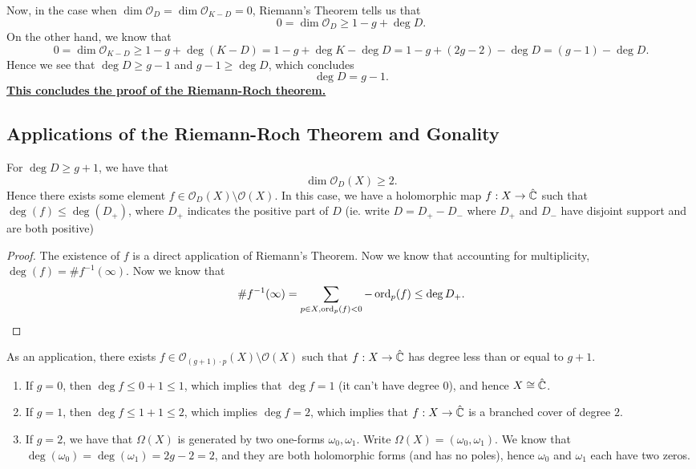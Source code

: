 \documentclass{article}
\begin{document}
{Now, in the case when $\dim \mathcal{O}_D = \dim \mathcal{O}_{K-D} = 0$, Riemann's Theorem tells us that
\[0 = \dim \mathcal{O}_D \geq 1 - g + \deg D.\]
On the other hand, we know that
\[0 = \dim \mathcal{O}_{K-D} \geq 1 - g + \deg(K-D) = 1 - g + \deg K - \deg D = 1 - g + (2g-2) - \deg D = (g - 1) - \deg D.\]
Hence we see that $\deg D \geq g-1$ and $g-1 \geq \deg D$, which concludes
\[\deg D = g-1.\]
\underline{\textbf{This concludes the proof of the Riemann-Roch theorem.}}

\subsection{Applications of the Riemann-Roch Theorem and Gonality}

\begin{theorem}
    For $\deg D \geq g + 1$, we have that
    \[\dim \mathcal{O}_D(X) \geq 2.\]
    Hence there exists some element $f \in \mathcal{O}_D(X) \setminus \mathcal{O}(X)$. In this case, we have a holomorphic map $f: X \to \hat{\mathbb{C}}$ such that $\deg(f) \leq \deg(D_+)$, where $D_+$ indicates the positive part of $D$ (ie. write $D = D_+ - D_-$ where $D_+$ and $D_-$ have disjoint support and are both positive)
\end{theorem}

\begin{proof}
    The existence of $f$ is a direct application of Riemann's Theorem. Now we know that accounting for multiplicity, $\deg(f) = \# f^{-1}(\infty)$. Now we know that
    \[\# f^{-1}(\infty) = \sum_{p \in X, \operatorname{ord}_p(f) < 0} -\operatorname{ord}_p(f) \leq \deg D_+.\]
\end{proof}

\begin{corollary}
        As an application, there exists $f \in \mathcal{O}_{(g+1) \cdot p}(X) \setminus \mathcal{O}(X)$ such that $f: X \to \hat{\mathbb{C}}$ has degree less than or equal to $g + 1$.
\end{corollary}

\begin{enumerate}
    \item If $g = 0$, then $\deg f \leq 0 + 1 \leq 1$, which implies that $\deg f = 1$ (it can't have degree $0$), and hence $X \cong \hat{\mathbb{C}}$.
    \item If $g = 1$, then $\deg f \leq 1 + 1 \leq 2$, which implies $\deg f = 2$, which implies that $f: X \to \hat{\mathbb{C}}$ is a branched cover of degree $2$.
    \item If $g = 2$, we have that $\Omega(X)$ is generated by two one-forms $\omega_0, \omega_1$. Write $\Omega(X) = (\omega_0, \omega_1)$. We know that $\deg(\omega_0) = \deg(\omega_1) = 2g - 2 = 2$, and they are both holomorphic forms (and has no poles), hence $\omega_0$ and $\omega_1$ each have two zeros.\\


\end{enumerate}}
\end{document}
